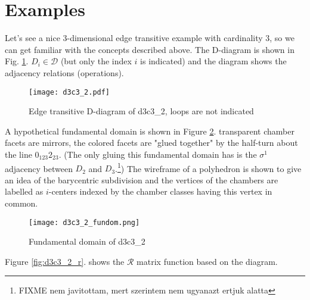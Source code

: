 \documentclass[12pt,a4paper]{article}
\numberwithin{equation}{section}
\theoremstyle{plain}%
\theoremstyle{definition}
\theoremstyle{remark}
\begin{document}
\section{Examples}

Let's see a nice $3$-dimensional edge transitive example with cardinality $3$,
so we can get familiar with the concepts described above. The D-diagram is shown
in Fig.  \ref{fig:d3c3_2}. $D_i\in \mathcal{D}$ (but only the index $i$ is
indicated) and the diagram shows the adjacency relations (operations).

\begin{figure}
  \caption{\label{fig:d3c3_2} Edge transitive D-diagram of d3c3\_2, loops are not indicated}
  \center
  \texttt{[image: d3c3\_2.pdf]}
\end{figure}

A hypothetical fundamental domain is shown in Figure \ref{fig:d3c3_2_fundom}.
transparent chamber facets are mirrors, the colored facets are "glued together"
by the half-turn about the line $0_{123}2_{23}$. (The
only gluing this fundamental domain has is the $\sigma^1$ adjacency between
$D_2$ and $D_3$.\footnote{FIXME nem javitottam, mert szerintem nem ugyanazt
ertjuk alatta}) The wireframe of a polyhedron is shown to give an idea of
the barycentric subdivision and the vertices of the chambers are
labelled as $i$-centers indexed by the chamber classes having this vertex in
common. 

\begin{figure}
  \caption{\label{fig:d3c3_2_fundom} Fundamental domain of d3c3\_2}
  \center
  \texttt{[image: d3c3\_2\_fundom.png]}
\end{figure}

Figure \ref{fig:d3c3_2_r}. shows the $\mathcal{R}$ matrix function based on the
diagram.%
\end{document}
